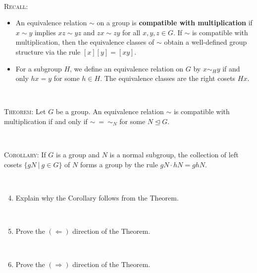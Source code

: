 \documentclass[12pt]{amsart}
\newcommand{\Bold}[1]{\contour{black}{#1}}
\newcommand\itemA{\stepcounter{enumi}\item[{\Bold{(\theenumi)}}]}
\newcommand\itemB{\stepcounter{enumi}\item[(\theenumi)]}
\begin{document}
\


\begin{framed}
\textsc{Recall:}
\begin{itemize}
\item An equivalence relation $\sim$ on a group is \textbf{compatible with multiplication} if $x \sim y$ implies ${xz \sim yz}$ and ${zx \sim zy}$ for all $x,y,z\in G$. If $\sim$ is compatible with multiplication, then the equivalence classes of $\sim$ obtain a well-defined group structure via the rule $[x][y] = [xy]$.
\item For a subgroup $H$, we define an equivalence relation on $G$ by $x\sim_H y$ if and only $hx = y$ for some $h\in H$. The equivalence classes are the right cosets $Hx$.
\end{itemize}

\


\textsc{Theorem:} Let $G$ be a group. An equivalence relation $\sim$ is compatible with multiplication if and only if ${\sim \ =\ \sim_N}$ for some $N\trianglelefteq G$.

\

\textsc{Corollary:} If $G$ is a group and $N$ is a normal subgroup, the collection of left cosets $\{gN \ | \ g\in G\}$ of $N$ forms a group by the rule $gN \cdot hN = ghN$.
\end{framed}

\

\begin{enumerate}\setcounter{enumi}{3}
\itemA Explain why the Corollary follows from the Theorem.

\

\itemA Prove the $(\Leftarrow)$ direction of the Theorem.

\

\itemB Prove the $(\Rightarrow)$ direction of the Theorem.
\end{enumerate}
\end{document}
